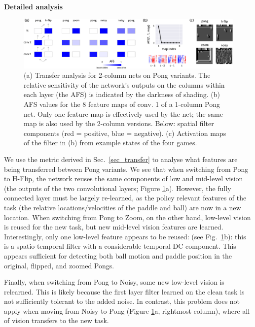 \textbf{Detailed analysis}

\begin{figure}[h]
  \centering
    \includegraphics[width=.95\textwidth]{figures/pong_results_neil.pdf}
    \caption{(a) Transfer analysis for 2-column nets on Pong variants.
      The relative sensitivity of the network's outputs on the columns
      within each layer (the AFS) is indicated by the darkness of shading.
      (b) AFS values for the 8 feature maps of
      conv. 1 of a 1-column Pong net. Only one feature map is
      effectively used by the net; the same map is also used by the
      2-column versions. Below: spatial filter components (red =
      positive, blue = negative). (c) Activation maps of the filter in (b) from example
      states of the four games.}
    \label{fig:pong_results_neil}
\end{figure}

We use the metric derived in Sec.~\ref{sec_transfer} to
analyse what features are being transferred between Pong variants.
We see that when switching from Pong to H-Flip, the network reuses the
same components of low and mid-level vision (the outputs of the two
convolutional layers; Figure \ref{fig:pong_results_neil}a). However, the fully connected layer must be
largely re-learned, as the policy relevant features of the task (the
relative locations/velocities of the paddle and ball) are now in a new
location. When switching from Pong to Zoom, on the other hand,
low-level vision is reused for the new task, but new mid-level vision
features are learned. Interestingly, only one low-level feature appears
to be reused:
(see Fig.~\ref{fig:pong_results_neil}b): this is a spatio-temporal
filter with a considerable temporal DC component. This appears
sufficient for detecting both ball motion and paddle position in the
original, flipped, and zoomed Pongs.

Finally, when switching from Pong to Noisy, some new low-level
vision is relearned. This is likely because the first layer
filter learned on the clean task is not sufficiently
tolerant to the added noise. In contrast, this problem does not apply
when moving from Noisy to Pong (Figure
\ref{fig:pong_results_neil}a, rightmost column), where all of vision
transfers to the new task.
